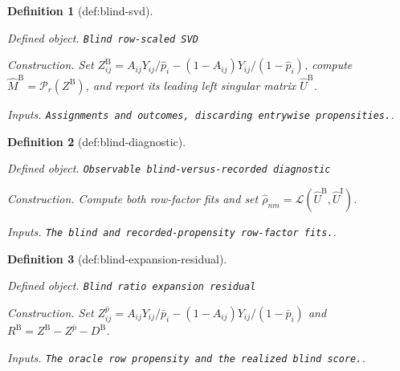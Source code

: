 \documentclass{article}
\newtheorem{definition}{Definition}
\begin{document}
\begin{definition}[def:blind-svd]\label{def:blind-svd}
\par\smallskip\noindent\emph{Defined object.} \texttt{Blind row-\allowbreak{}scaled SVD}
\par\smallskip\noindent\emph{Construction.} Set \(Z^{\mathrm B}_{ij}=A_{ij}Y_{ij}/\widehat p_i-(1-A_{ij})Y_{ij}/(1-\widehat p_i)\), compute \(\widehat M^{\mathrm B}=\mathcal P_r(Z^{\mathrm B})\), and report its leading left singular matrix \(\widehat U^{\mathrm B}\).
\par\smallskip\noindent\emph{Inputs.} \texttt{Assignments and outcomes,\allowbreak{} discarding entrywise propensities.}.
\end{definition}

\begin{definition}[def:blind-diagnostic]\label{def:blind-diagnostic}
\par\smallskip\noindent\emph{Defined object.} \texttt{Observable blind-\allowbreak{}versus-\allowbreak{}recorded diagnostic}
\par\smallskip\noindent\emph{Construction.} Compute both row-factor fits and set \(\widehat\rho_{nm}=\mathcal L(\widehat U^{\mathrm B},\widehat U^{\mathrm I})\).
\par\smallskip\noindent\emph{Inputs.} \texttt{The blind and recorded-\allowbreak{}propensity row-\allowbreak{}factor fits.}.
\end{definition}

\begin{definition}[def:blind-expansion-residual]\label{def:blind-expansion-residual}
\par\smallskip\noindent\emph{Defined object.} \texttt{Blind ratio expansion residual}
\par\smallskip\noindent\emph{Construction.} Set \(Z^{\bar p}_{ij}=A_{ij}Y_{ij}/\bar p_i-(1-A_{ij})Y_{ij}/(1-\bar p_i)\) and \(R^{\mathrm B}=Z^{\mathrm B}-Z^{\bar p}-D^{\mathrm B}\).
\par\smallskip\noindent\emph{Inputs.} \texttt{The oracle row propensity and the realized blind score.}.
\end{definition}
\end{document}
